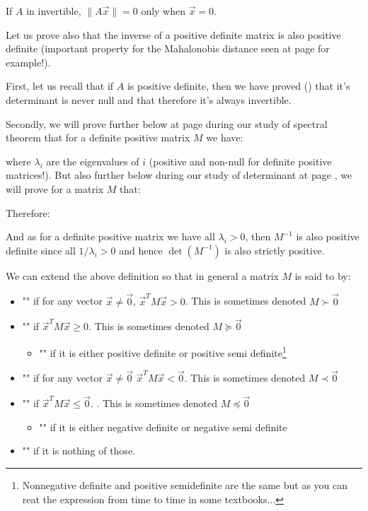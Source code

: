 \begin{enumerate}
		If $A$ in invertible, $\|A\vec{x}\|=0$ only when $\vec{x}=0$.
		
		\label{inverse definite positive matrix is also definite positive} Let us prove also that the inverse of a positive definite matrix is also positive definite (important property for the Mahalonobis distance seen at page \pageref{Mahalanobis distance} for example!).

		First, let us recall that if $A$ is positive definite, then we have proved () that it's determinant is never null and that therefore it's always invertible. 
		
		Secondly, we will prove further below at page \pageref{spectral theorem} during our study of spectral theorem that for a definite positive matrix $M$ we have:
		
		where $\lambda_i$ are the eigenvalues of $i$ (positive and non-null for definite positive matrices!). But also further below during our study of determinant at page \pageref{inverse determinant}, we will prove for a matrix $M$ that:
		
		Therefore:
		
		And as for a definite positive matrix we have all $\lambda_i>0$, then $M^{-1}$ is also positive definite since all $1/\lambda_i>0$ and hence $\det(M^{-1})$ is also strictly positive.
		
		We can extend the above definition so that in general a matrix $M$ is said to by:
		\begin{itemize}
			\item "" if for any vector $\vec{x}\neq\vec{0}$, $\vec{x}^TM\vec{x}>0$. This is sometimes denoted $M\succ \vec{0}$
			\item "" if $\vec{x}^TM\vec{x}\geq 0$. This is sometimes denoted $M\succeq \vec{0}$
			\begin{itemize}
			\item "" if it is either positive definite or positive semi definite\footnote{Nonnegative definite and positive semidefinite are the same but as you can reat the expression from time to time in some textbooks...}
			\end{itemize}
			
			\item "" if for any vector $\vec{x}\neq\vec{0}$ $\vec{x}^TM\vec{x}<\vec{0}$. This is sometimes denoted $M\prec \vec{0}$
			\item "" if $\vec{x}^TM\vec{x}\leq\vec{0}$. . This is sometimes denoted $M\preceq \vec{0}$
			\begin{itemize}
				\item "" if it is either negative definite or negative semi definite
			\end{itemize}
			\item "" if it is nothing of those.
		\end{itemize}
		

\end{enumerate}
